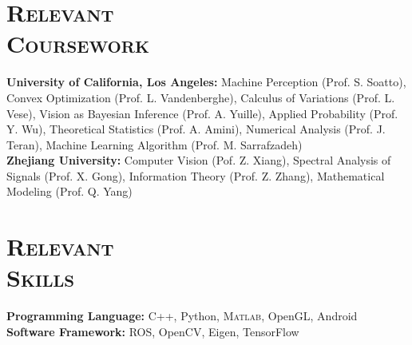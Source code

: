 \documentclass[margin, line, 10pt]{res} %
\begin{document}
\begin{resume}
\section{\textsc{Relevant\\Coursework}}
\textbf{University of California, Los Angeles:} Machine Perception (Prof. S. Soatto), Convex Optimization (Prof. L. Vandenberghe), Calculus of Variations (Prof. L. Vese), Vision as Bayesian Inference (Prof. A. Yuille), Applied Probability (Prof. Y. Wu), Theoretical Statistics (Prof. A. Amini), Numerical Analysis (Prof. J. Teran), Machine Learning Algorithm (Prof. M. Sarrafzadeh)\\
\textbf{Zhejiang University:} Computer Vision (Pof. Z. Xiang), Spectral Analysis of Signals (Prof. X. Gong), Information Theory (Prof. Z. Zhang), Mathematical Modeling (Prof. Q. Yang)

\section{\textsc{Relevant\\Skills}}
\textbf{Programming Language:} C++, Python, \textsc{Matlab}, OpenGL, Android\\
\textbf{Software Framework:} ROS, OpenCV, Eigen, TensorFlow


\end{resume}
\end{document}
